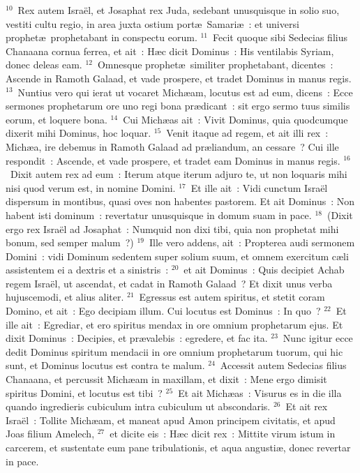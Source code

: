 ${}^{10}$~Rex autem Isra\"el, et Josaphat rex Juda, sedebant unusquisque in solio suo, vestiti cultu regio, in area juxta ostium port\ae\ Samari\ae~: et universi prophet\ae\ prophetabant in conspectu eorum.
${}^{11}$~Fecit quoque sibi Sedecias filius Chanaana cornua ferrea, et ait~: H\ae c dicit Dominus~: His ventilabis Syriam, donec deleas eam.
${}^{12}$~Omnesque prophet\ae\ similiter prophetabant, dicentes~: Ascende in Ramoth Galaad, et vade prospere, et tradet Dominus in manus regis.
${}^{13}$~Nuntius vero qui ierat ut vocaret Mich\ae am, locutus est ad eum, dicens~: Ecce sermones prophetarum ore uno regi bona pr\ae dicant~: sit ergo sermo tuus similis eorum, et loquere bona.
${}^{14}$~Cui Mich\ae as ait~: Vivit Dominus, quia quodcumque dixerit mihi Dominus, hoc loquar.
${}^{15}$~Venit itaque ad regem, et ait illi rex~: Mich\ae a, ire debemus in Ramoth Galaad ad pr\ae liandum, an cessare~? Cui ille respondit~: Ascende, et vade prospere, et tradet eam Dominus in manus regis.
${}^{16}$~Dixit autem rex ad eum~: Iterum atque iterum adjuro te, ut non loquaris mihi nisi quod verum est, in nomine Domini.
${}^{17}$~Et ille ait~: Vidi cunctum Isra\"el dispersum in montibus, quasi oves non habentes pastorem. Et ait Dominus~: Non habent isti dominum~: revertatur unusquisque in domum suam in pace.
${}^{18}$~(Dixit ergo rex Isra\"el ad Josaphat~: Numquid non dixi tibi, quia non prophetat mihi bonum, sed semper malum~?)
${}^{19}$~Ille vero addens, ait~: Propterea audi sermonem Domini~: vidi Dominum sedentem super solium suum, et omnem exercitum c\ae li assistentem ei a dextris et a sinistris~:
${}^{20}$~et ait Dominus~: Quis decipiet Achab regem Isra\"el, ut ascendat, et cadat in Ramoth Galaad~? Et dixit unus verba hujuscemodi, et alius aliter.
${}^{21}$~Egressus est autem spiritus, et stetit coram Domino, et ait~: Ego decipiam illum. Cui locutus est Dominus~: In quo~?
${}^{22}$~Et ille ait~: Egrediar, et ero spiritus mendax in ore omnium prophetarum ejus. Et dixit Dominus~: Decipies, et pr\ae valebis~: egredere, et fac ita.
${}^{23}$~Nunc igitur ecce dedit Dominus spiritum mendacii in ore omnium prophetarum tuorum, qui hic sunt, et Dominus locutus est contra te malum.
${}^{24}$~Accessit autem Sedecias filius Chanaana, et percussit Mich\ae am in maxillam, et dixit~: Mene ergo dimisit spiritus Domini, et locutus est tibi~?
${}^{25}$~Et ait Mich\ae as~: Visurus es in die illa quando ingredieris cubiculum intra cubiculum ut abscondaris.
${}^{26}$~Et ait rex Isra\"el~: Tollite Mich\ae am, et maneat apud Amon principem civitatis, et apud Joas filium Amelech,
${}^{27}$~et dicite eis~: H\ae c dicit rex~: Mittite virum istum in carcerem, et sustentate eum pane tribulationis, et aqua angusti\ae , donec revertar in pace.
